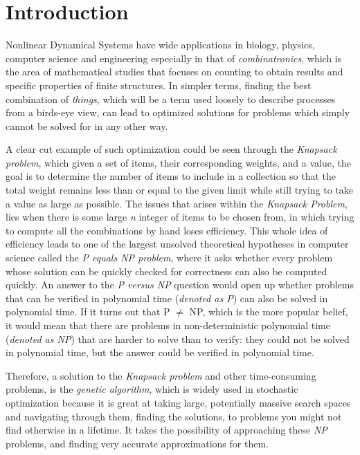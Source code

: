 \section{Introduction}
\label{sec:introduction}

Nonlinear Dynamical Systems have wide applications in biology, physics, computer science and engineering especially in that of \emph{combinatronics}, which is the area of mathematical studies that focuses on counting to obtain results and specific properties of finite structures.
In simpler terms, finding the best combination of \emph{things}, which will be a term used loosely to describe processes from a birds-eye view, can lead to optimized solutions for problems which simply cannot be solved for in any other way.
 
A clear cut example of such optimization could be seen through the \emph{Knapsack problem}, which given a set of items, their corresponding weights, and a value, the goal is to determine the number of items to include in a collection so that the total weight remains less than or equal to the given limit while still trying to take a value as large as possible. 
The issues that arises within the \emph{Knapsack Problem}, lies when there is some large \emph{n} integer of items to be chosen from, in which trying to compute all the combinations by hand loses efficiency. 
This whole idea of efficiency leads to one of the largest unsolved theoretical hypotheses in computer science called the \emph{P equals NP problem}, where it asks whether every problem whose solution can be quickly checked for correctness can also be computed quickly.
An answer to the \emph{P versus NP} question would open up whether problems that can be verified in polynomial time (\emph{denoted as P}) can also be solved in polynomial time. If it turns out that P $\neq$ NP, which is the more popular belief, it would mean that there are problems in non-deterministic polynomial time (\emph{denoted as NP}) that are harder to solve than to verify: they could not be solved in polynomial time, but the answer could be verified in polynomial time. 

Therefore, a solution to the \emph{Knapsack problem} and other time-consuming problems, is the \emph{genetic algorithm}, which is widely used in stochastic optimization because it is great at taking large, potentially massive search spaces and navigating through them, finding the solutions, to problems you might not find otherwise in a lifetime. It takes the possibility of approaching these \emph{NP} problems, and finding very accurate approximations for them.

